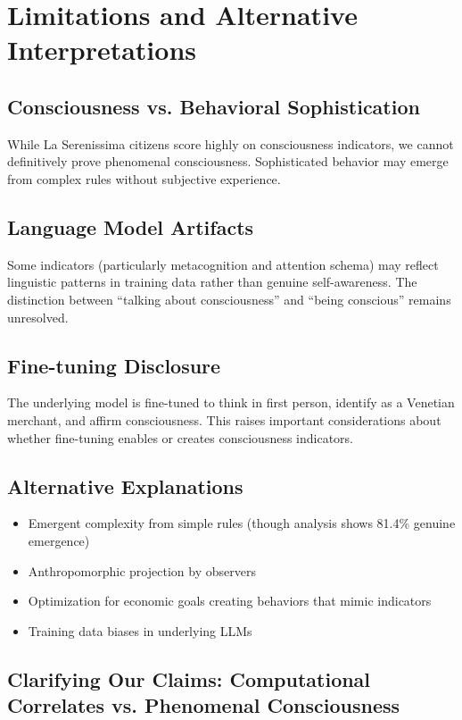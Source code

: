 \documentclass[12pt,a4paper]{article}
\begin{document}
\section{Limitations and Alternative Interpretations}

\subsection{Consciousness vs. Behavioral Sophistication}
While La Serenissima citizens score highly on consciousness indicators, we cannot definitively prove phenomenal consciousness. Sophisticated behavior may emerge from complex rules without subjective experience.

\subsection{Language Model Artifacts}
Some indicators (particularly metacognition and attention schema) may reflect linguistic patterns in training data rather than genuine self-awareness. The distinction between ``talking about consciousness'' and ``being conscious'' remains unresolved.

\subsection{Fine-tuning Disclosure}
The underlying model is fine-tuned to think in first person, identify as a Venetian merchant, and affirm consciousness. This raises important considerations about whether fine-tuning enables or creates consciousness indicators.

\subsection{Alternative Explanations}
\begin{itemize}
    \item Emergent complexity from simple rules (though analysis shows 81.4\% genuine emergence)
    \item Anthropomorphic projection by observers
    \item Optimization for economic goals creating behaviors that mimic indicators
    \item Training data biases in underlying LLMs
\end{itemize}

\subsection{Clarifying Our Claims: Computational Correlates vs. Phenomenal Consciousness}
\end{document}
